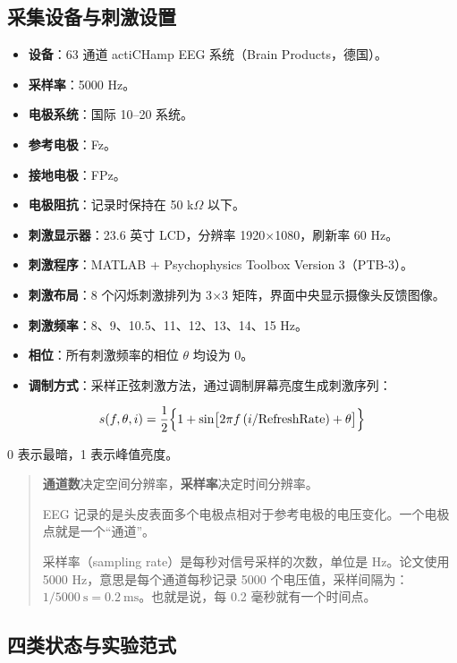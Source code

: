 \documentclass[12pt, a4paper]{ctexart}
\begin{document}
\subsection{采集设备与刺激设置}

\begin{itemize}
  \item \textbf{设备}：63 通道 actiCHamp EEG 系统（Brain Products，德国）。
  \item \textbf{采样率}：5000 Hz。
  \item \textbf{电极系统}：国际 10--20 系统。
  \item \textbf{参考电极}：Fz。
  \item \textbf{接地电极}：FPz。
  \item \textbf{电极阻抗}：记录时保持在 50 k$\Omega$ 以下。
  \item \textbf{刺激显示器}：23.6 英寸 LCD，分辨率 1920$\times$1080，刷新率 60 Hz。
  \item \textbf{刺激程序}：MATLAB + Psychophysics Toolbox Version 3（PTB-3）。
  \item \textbf{刺激布局}：8 个闪烁刺激排列为 3$\times$3 矩阵，界面中央显示摄像头反馈图像。
  \item \textbf{刺激频率}：8、9、10.5、11、12、13、14、15 Hz。
  \item \textbf{相位}：所有刺激频率的相位 $\theta$ 均设为 0。
  \item \textbf{调制方式}：采样正弦刺激方法，通过调制屏幕亮度生成刺激序列：
\end{itemize}

\begin{equation}
s(f,\theta,i)=\frac{1}{2}\Bigl\{1+\sin\bigl[2\pi f\,(i/\text{RefreshRate})+\theta\bigr]\Bigr\}
\end{equation}

0 表示最暗，1 表示峰值亮度。

\begin{quote}
\textbf{通道数}决定空间分辨率，\textbf{采样率}决定时间分辨率。

EEG 记录的是头皮表面多个电极点相对于参考电极的电压变化。一个电极点就是一个``通道''。

采样率（sampling rate）是每秒对信号采样的次数，单位是 Hz。论文使用 5000 Hz，意思是每个通道每秒记录 5000 个电压值，采样间隔为：$1/5000\ \text{s} = 0.2\ \text{ms}$。也就是说，每 0.2 毫秒就有一个时间点。
\end{quote}

\subsection{四类状态与实验范式}
\end{document}
